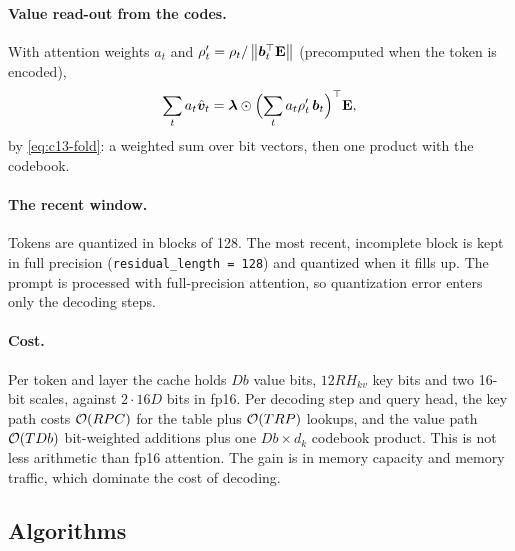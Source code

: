\paragraph{Value read-out from the codes.} With attention weights $a_t$ and $\rho'_t=\rho_t/\left\lVert \bm{b}_t^{\top}\mathbf{E}\right\rVert$
(precomputed when the token is encoded),
\begin{equation}\label{eq:c13-commvq-vread}
  \sum_t a_t\hat{\bm{v}}_t = \bm{\lambda}\odot\Bigl(\sum_t a_t\rho'_t\,\bm{b}_t\Bigr)^{\top}\mathbf{E},
\end{equation}
by \eqref{eq:c13-fold}: a weighted sum over bit vectors, then one product with the codebook.

\paragraph{The recent window.} Tokens are quantized in blocks of 128. The most recent, incomplete block
is kept in full precision (\texttt{residual\_length = 128}) and quantized when it fills up. The prompt is
processed with full-precision attention, so quantization error enters only the decoding steps.

\paragraph{Cost.} Per token and layer the cache holds $Db$ value bits, $12RH_{kv}$ key bits and two
16-bit scales, against $2\cdot16D$ bits in fp16. Per decoding step and query head, the key path costs
$\mathcal{O}(RPC)$ for the table plus $\mathcal{O}(TRP)$ lookups, and the value path $\mathcal{O}(TDb)$ bit-weighted additions
plus one $Db\times d_k$ codebook product. This is not less arithmetic than fp16 attention. The gain is in
memory capacity and memory traffic, which dominate the cost of decoding.

\subsection{Algorithms}

